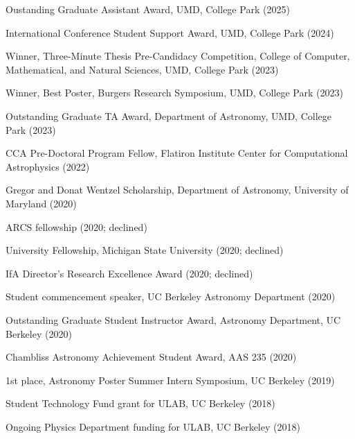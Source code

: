 \item[{\color{numcolor}\scriptsize16}] Oustanding Graduate Assistant Award, UMD, College Park (2025)

\item[{\color{numcolor}\scriptsize15}] International Conference Student Support Award, UMD, College Park (2024)

\item[{\color{numcolor}\scriptsize14}] Winner, Three-Minute Thesis Pre-Candidacy Competition, College of Computer, Mathematical, and Natural Sciences, UMD, College Park (2023)

\item[{\color{numcolor}\scriptsize13}] Winner, Best Poster, Burgers Research Symposium, UMD, College Park (2023)

\item[{\color{numcolor}\scriptsize12}] Outstanding Graduate TA Award, Department of Astronomy, UMD, College Park (2023)

\item[{\color{numcolor}\scriptsize11}] CCA Pre-Doctoral Program Fellow, Flatiron Institute Center for Computational Astrophysics (2022)

\item[{\color{numcolor}\scriptsize10}] Gregor and Donat Wentzel Scholarship, Department of Astronomy, University of Maryland (2020)

\item[{\color{numcolor}\scriptsize9}] ARCS fellowship (2020; declined)

\item[{\color{numcolor}\scriptsize8}] University Fellowship, Michigan State University (2020; declined)

\item[{\color{numcolor}\scriptsize7}] IfA Director's Research Excellence Award (2020; declined)

\item[{\color{numcolor}\scriptsize6}] Student commencement speaker, UC Berkeley Astronomy Department (2020)

\item[{\color{numcolor}\scriptsize5}] Outstanding Graduate Student Instructor Award, Astronomy Department, UC Berkeley (2020)

\item[{\color{numcolor}\scriptsize4}] Chambliss Astronomy Achievement Student Award, AAS 235 (2020)

\item[{\color{numcolor}\scriptsize3}] 1st place, Astronomy Poster Summer Intern Symposium, UC Berkeley (2019)

\item[{\color{numcolor}\scriptsize2}] Student Technology Fund grant for ULAB, UC Berkeley (2018)

\item[{\color{numcolor}\scriptsize1}] Ongoing Physics Department funding for ULAB, UC Berkeley (2018)